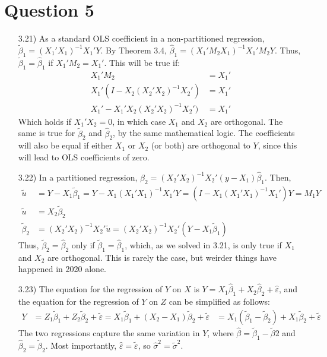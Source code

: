 \documentclass{article}
\renewcommand{\tilde}[1]{\widetilde{#1}}
\newcommand{\tb}{\tilde{\beta}}
\newcommand{\bhat}{\hat{\beta}}
\newcommand{\vhat}{\hat{\varepsilon}}
\begin{document}
\section*{Question 5}
\begin{itemize}
	\item[3.21)] As a standard OLS coefficient in a non-partitioned regression, ${\tb_1=(X_1'X_1)^{-1}X_1'Y}$. By Theorem 3.4, ${\bhat_1 = (X_1'M_2X_1)^{-1}X_1'M_2Y}$. Thus, ${\tb_1=\bhat_1}$ if ${X_1'M_2=X_1'}$. This will be true if:
		\begin{align*}
			X_1'M_2								&= X_1'	\\
			X_1'(I - X_2(X_2'X_2)^{-1}X_2')		&= X_1'	\\
			X_1' - X_1'X_2(X_2'X_2)^{-1}X_2')	&= X_1'
		\end{align*}
		Which holds if ${X_1'X_2=0}$, in which case $X_1$ and $X_2$ are orthogonal. The same is true for $\tb_2$ and $\bhat_2$, by the same mathematical logic. The coefficients will also be equal if either $X_1$ or $X_2$ (or both) are orthogonal to $Y$, since this will lead to OLS coefficients of zero.
	
	\pagebreak
	\item[3.22)] In a partitioned regression, ${\bhat_2 = (X_2'X_2)^{-1}X_2'(y-X_1)\bhat_1}$. Then,
		\begin{align*}
			\tilde{u} 	&= Y-X_1\tb_1 = Y - X_1(X_1'X_1)^{-1}X_1'Y = (I - X_1(X_1'X_1)^{-1}X_1')Y = M_1Y	\\
			\tilde{u} 	&= X_2\tb_2																			\\
			\tb_2		&= (X_2'X_2)^{-1}X_2'\tilde{u} = (X_2'X_2)^{-1}X_2'(Y-X_1\tb_1)
		\end{align*}
		Thus, $\tb_2=\bhat_2$ only if ${\tb_1=\bhat_1}$, which, as we solved in 3.21, is only true if $X_1$ and $X_2$ are orthogonal. This is rarely the case, but weirder things have happened in 2020 alone.
	
	\item[3.23)] The equation for the regression of $Y$ on $X$ is ${Y = X_1\bhat_1 + X_2\bhat_2 + \vhat}$, and the equation for the regression of $Y$ on $Z$ can be simplified as follows:
		\begin{align*}
			Y	&= Z_1\tb_1 + Z_2\tb_2 + \tilde{\varepsilon} = X_1\tb_1 + (X_2 - X_1)\tb_2 + \tilde{\varepsilon} 
				&= X_1(\tb_1 - \tb_2) + X_1\tb_2 + \tilde{\varepsilon} 
		\end{align*}
		The two regressions capture the same variation in $Y$, where ${\bhat = \tb_1-\tb2}$ and $\bhat_2=\tb_2$. Most importantly, ${\vhat=\tilde{\varepsilon}}$, so ${\hat{\sigma}^2=\tilde{\sigma}^2}$.
	
\end{itemize}
\end{document}
